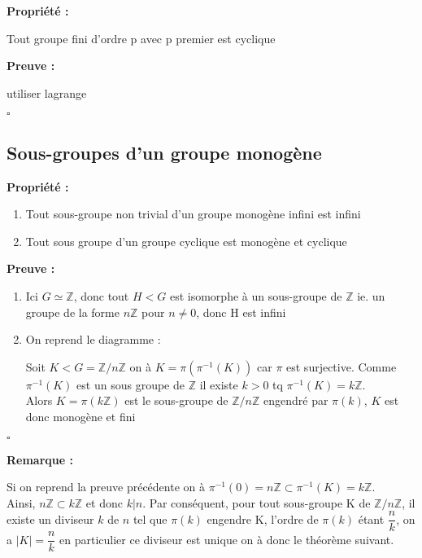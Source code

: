 \documentclass{report}
\renewenvironment{leftbar}{%
  \def\FrameCommand{\vrule width 0.4pt \hspace{10pt}}%
  \MakeFramed {\advance\hsize-\width \FrameRestore}}%
 {\endMakeFramed}%
\newenvironment{preuve}{\vspace*{0.5cm}
    \begin{leftbar}
    \noindent\textbf{Preuve :}\par}{
    \begin{flushright}
    $\square$
    \end{flushright}
    \end{leftbar}
}
\newenvironment{prop}{\begin{tcolorbox}[colframe= white]
    \textbf{Propriété :}
     \par}
    {\end{tcolorbox}}
\newcommand{\remarque}{
    \noindent\textbf{Remarque :} \par
}
\newcommand{\Z}{\mathbb{Z}}
\newcommand{\znz}{\Z/n\Z}
\begin{document}
\begin{prop}
Tout groupe fini d'ordre p avec p premier est cyclique
\end{prop}

\begin{preuve}
utiliser lagrange
\end{preuve}


\subsection{Sous-groupes d'un groupe monogène}

\begin{prop}
\begin{enumerate}
\item Tout sous-groupe non trivial d'un groupe monogène infini est infini
\item Tout sous groupe d'un groupe cyclique est monogène et cyclique
\end{enumerate}
\end{prop}

\begin{preuve}
\begin{enumerate}
\item Ici $G\simeq \Z$, donc tout $H<G$ est isomorphe à un sous-groupe de $\Z$ ie. un groupe de la forme $n\Z$ pour $n \neq 0$, donc H est infini
\item On reprend le diagramme :

\begin{center}
\end{center}

Soit $ K < G= \Z/n\Z$ on à $K=\pi(\pi^{-1}(K))$ car $\pi$ est surjective. Comme $\pi^{-1}(K)$ est un sous groupe de $\Z$ il existe $k>0$ tq $\pi^{-1}(K)=k\Z$.\\
Alors $K = \pi(k\Z)$ est le sous-groupe de $\Z/n\Z$ engendré par $\pi(k)$, $K$ est donc monogène et fini

\end{enumerate}
\end{preuve}

\remarque{Si on reprend la preuve précédente on à $\pi^{-1}(0) = n\Z \subset \pi^{-1}(K)= k\Z$.\\ Ainsi, $n\Z \subset k\Z$ et donc $k|n$. Par conséquent, pour tout sous-groupe K de $\znz$, il existe un diviseur $k$ de $n$ tel que $\pi(k)$ engendre K, l'ordre de $\pi(k)$ étant $\dfrac{n}{k}$, on a $|K|=\dfrac{n}{k}$ en particulier ce diviseur est unique on à donc le théorème suivant.}
\end{document}
